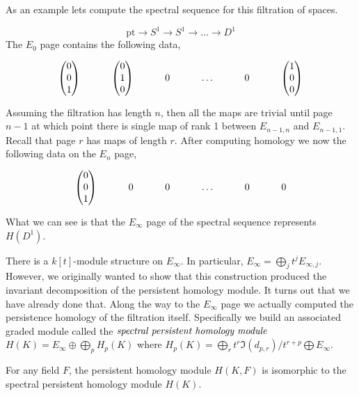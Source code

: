 As an example lets compute the spectral sequence for this filtration of spaces.
\begin{example}
\[ \textrm{pt} \rightarrow S^1 \rightarrow S^1 \rightarrow \ldots \rightarrow D^1 \] 
The $E_0$ page contains the following data,
\[ \begin{tikzcd}
\begin{pmatrix}
0 \\
0 \\
1 \\
\end{pmatrix} & 
\begin{pmatrix}
0 \\ 
1 \\ 
0
\end{pmatrix} & 0 & \ldots & 0 & 
\begin{pmatrix} 
1 \\ 
0 \\ 
0 
\end{pmatrix}
\end{tikzcd} \]
Assuming the filtration has length $n$, then all the maps are trivial until page $n-1$ at which point there is single map of rank 1 between $E_{{n-1},n}$ and $E_{{n-1},1}$.
Recall that page $r$ has maps of length $r$. After computing homology we now the following data on the $E_n$ page,
\[ \begin{tikzcd}
\begin{pmatrix}
0 \\
0 \\
1 \\
\end{pmatrix} & 0 & 0 & \ldots & 0 & 0
\end{tikzcd} \]
What we can see is that the $E_\infty$ page of the spectral sequence represents $H(D^1)$. 
\end{example}
There is a $k[t]$-module structure on $E_\infty$. In particular, $E_\infty = \bigoplus_j t^j E_{\infty,j}$. However, we originally wanted to show that this construction produced the invariant decomposition of the persistent homology module. It turns out that we have already done that. Along the way to the $E_\infty$ page we actually computed the persistence homology of the filtration itself. Specifically we build an associated graded module called the $\emph{spectral persistent homology module}$ $H(K) = E_\infty \oplus \bigoplus_p H_p(K)$ where $H_p(K) = \bigoplus_r t^r \Im(d_{p,r}) / t^{r+p} \bigoplus E_\infty$.
\begin{theorem}
For any field $F$, the persistent homology module $H(K,F)$ is isomorphic to the spectral persistent homology module $H(K)$.
\end{theorem}
